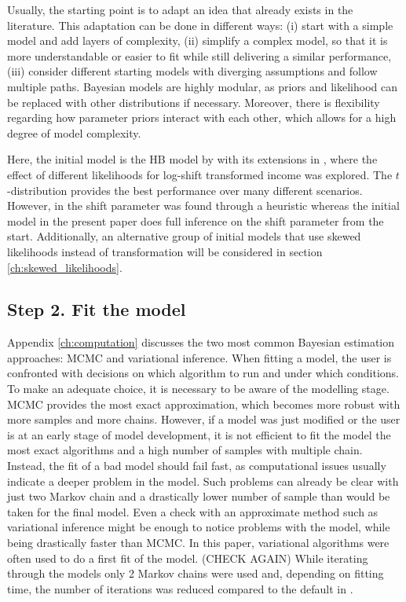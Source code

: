 Usually, the starting point is to adapt an idea that already exists in the literature.
This adaptation can be done in different ways: (i) start with a simple model and add layers of complexity, (ii) simplify a complex model, so that it is more understandable or easier to fit while still delivering a similar performance, (iii) consider different starting models with diverging assumptions and follow multiple paths.
Bayesian models are highly modular, as priors and likelihood can be replaced with other distributions if necessary.
Moreover, there is flexibility regarding how parameter priors interact with each other, which allows for a high degree of model complexity.


Here, the initial model is the HB model by \cite{molina_small_2014} with its extensions in \cite{morelli_hierarchical_2021}, where the effect of different likelihoods for log-shift transformed income was explored.
The $t$-distribution provides the best performance over many different scenarios.
However, in \cite{morelli_hierarchical_2021} the shift parameter was found through a heuristic whereas
the initial model in the present paper does full inference on the shift parameter from the start.
Additionally, an alternative group of initial models that use skewed likelihoods instead of transformation will be considered in section \ref{ch:skewed_likelihoods}.


\subsection{Step 2. Fit the model}

Appendix \ref{ch:computation} discusses the two most common Bayesian estimation approaches: MCMC and variational inference.
When fitting a model, the user is confronted with decisions on which algorithm to run and under which conditions.
To make an adequate choice, it is necessary to be aware of the modelling stage.
MCMC provides the most exact approximation, which becomes more robust with more samples and more chains.
However, if a model was just modified or the user is at an early stage of model development, it is not efficient to fit the model the most exact algorithms and a high number of samples with multiple chain.
Instead, the fit of a bad model should fail fast, as computational issues usually indicate a deeper problem in the model.
Such problems can already be clear with just two Markov chain and a drastically lower number of sample than would be taken for the final model.
Even a check with an approximate method such as variational inference might be enough to notice problems with the model, while being drastically faster than MCMC.
In this paper, variational algorithms were often used to do a first fit of the model.
(CHECK AGAIN) While iterating through the models only 2 Markov chains were used and, depending on fitting time, the number of iterations was reduced compared to the default in .


